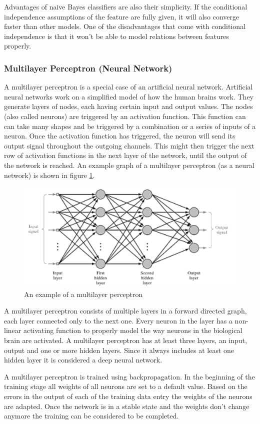 Advantages of naive Bayes classifiers are also their simplicity. If the conditional independence assumptions of the feature are fully given, it will also converge faster than other models. One of the disadvantages that come with conditional independence is that it won't be able to model relations between features properly. 


\subsubsection{Multilayer Perceptron (Neural Network)}
A multilayer perceptron is a special case of an artificial neural network. Artificial neural networks work on a simplified model of how the human brains work. They generate layers of nodes, each having certain input and output values. The nodes (also called neurons) are triggered by an activation function. This function can can take many shapes and be triggered by a combination or a series of inputs of a neuron. Once the activation function has triggered, the neuron will send its output signal throughout the outgoing channels. This might then trigger the next row of activation functions in the next layer of the network, until the output of the network is reached. An example graph of a multilayer perceptron (as a neural network) is shown in figure \ref{fig:multilayer-perceptron}.

\begin{figure}[!ht]
	\centering
	\includegraphics[width=1.0\textwidth]{images/multilayer-perceptron}
	\caption{An example of a multilayer perceptron \cite{MultilayerPerceptron}}
	\label{fig:multilayer-perceptron}
\end{figure}

A multilayer perceptron consists of multiple layers in a forward directed graph, each layer connected only to the next one. Every neuron in the layer has a non-linear activating function to properly model the way neurons in the biological brain are activated. A multilayer perceptron has at least three layers, an input, output and one or more hidden layers. Since it always includes at least one hidden layer it is considered a deep neural network.

A multilayer perceptron is trained using backpropagation. In the beginning of the training stage all weights of all neurons are set to a default value. Based on the errors in the output of each of the training data entry the weights of the neurons are adapted. Once the network is in a stable state and the weights don't change anymore the training can be considered to be completed.
